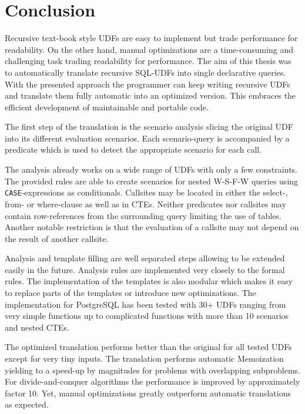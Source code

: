 \chapter{Conclusion} \label{conclusion}



Recursive text-book style UDFs are easy to implement but trade performance for readability. On the other hand, manual optimizations are a time-consuming and challenging task trading readability for performance. The aim of this thesis was to automatically translate recursive SQL-UDFs into single declarative queries.  With the presented approach the programmer can keep writing recursive UDFs and translate them fully automatic into an optimized version. This embraces the efficient development of maintainable and portable code.

The first step of the translation is the scenario analysis slicing the original UDF into its different evaluation scenarios. Each scenario-query is accompanied by a predicate which is used to detect the appropriate scenario for each call.

The analysis already works on a wide range of UDFs with only a few constraints. The provided rules are able to create scenarios for nested W-S-F-W queries using \texttt{CASE}-expressions as conditionals. Callsites may be located in either the select-, from- or where-clause as well as in CTEs. Neither predicates nor callsites may contain row-references from the surrounding query limiting the use of tables. Another notable restriction is that the evaluation of a callsite may not depend on the result of another callsite.

Analysis and template filling are well separated steps allowing to be extended easily in the future. Analysis rules are implemented very closely to the formal rules. The implementation of the templates is also modular which makes it easy to replace parts of the templates or introduce new optimizations. The implementation for PostgreSQL has been tested with 30+ UDFs ranging from very simple functions up to complicated functions with more than 10 scenarios and nested CTEs.

The optimized translation performs better than the original for all tested UDFs except for very tiny inputs. The translation performs automatic Memoization yielding to a speed-up by magnitudes for problems with overlapping subproblems. For divide-and-conquer algorithms the performance is improved by approximately factor 10. Yet, manual optimizations greatly outperform automatic translations as expected.

